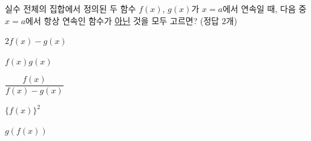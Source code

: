 실수 전체의 집합에서 정의된 두 함수 $f(x)$, $g(x)$가 $x=a$에서 연속일 때, 다음 중 $x=a$에서 항상 연속인 함수가 \underline{아닌} 것을 모두 고르면? (정답 $2$개)
\begin{choices32}{\rule[-3ex]{0pt}{8ex}$2f(x)-g(x)$}{\rule[-3ex]{0pt}{8ex}$f(x)g(x)$}{\rule[-3ex]{0pt}{8ex}$\dfrac{f(x)}{f(x)-g(x)}$}{\rule[-3ex]{0pt}{8ex}$\{f(x)\}^2$}{\rule[-3ex]{0pt}{8ex}$g(f(x))$}\end{choices32}
